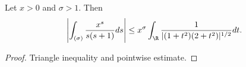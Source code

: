\begin{lemma}[vertIntBound]
\label{vertIntBound}
\leanok
Let $x>0$ and $\sigma>1$. Then
  $$\left|
  \int_{(\sigma)}\frac{x^s}{s(s+1)}ds\right| \leq
    x^\sigma \int_\R\frac{1}{|(1+t ^ 2)(2+t ^ 2)|^{1/2}}dt.$$
\end{lemma}
\begin{proof}
\leanok
Triangle inequality and pointwise estimate.
\end{proof}
